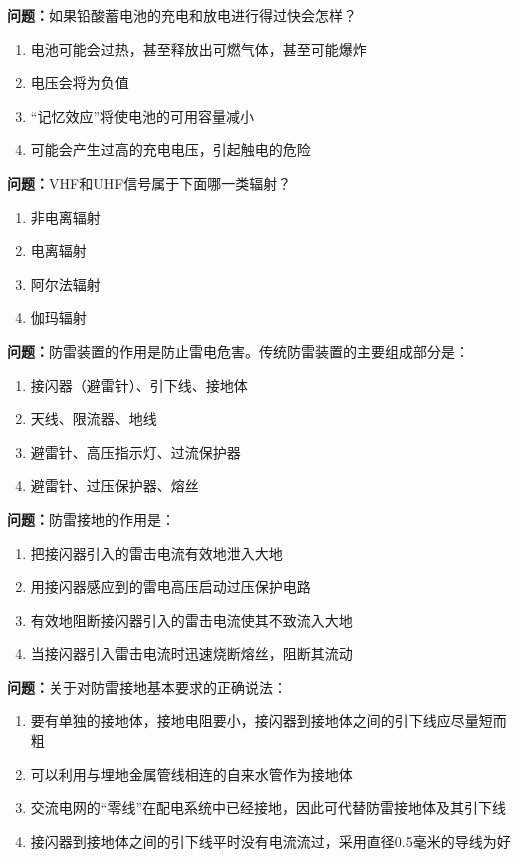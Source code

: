 \documentclass{ctexbook}
\begin{document}
\textbf{问题：}如果铅酸蓄电池的充电和放电进行得过快会怎样？
\begin{enumerate}[label=\Alph*), leftmargin=3em]
\item 电池可能会过热，甚至释放出可燃气体，甚至可能爆炸
\item 电压会将为负值
\item “记忆效应”将使电池的可用容量减小
\item 可能会产生过高的充电电压，引起触电的危险
\end{enumerate}

\textbf{问题：}VHF和UHF信号属于下面哪一类辐射？
\begin{enumerate}[label=\Alph*), leftmargin=3em]
\item 非电离辐射
\item 电离辐射
\item 阿尔法辐射
\item 伽玛辐射
\end{enumerate}

\textbf{问题：}防雷装置的作用是防止雷电危害。传统防雷装置的主要组成部分是：
\begin{enumerate}[label=\Alph*), leftmargin=3em]
\item 接闪器（避雷针）、引下线、接地体
\item 天线、限流器、地线
\item 避雷针、高压指示灯、过流保护器
\item 避雷针、过压保护器、熔丝
\end{enumerate}

\textbf{问题：}防雷接地的作用是：
\begin{enumerate}[label=\Alph*), leftmargin=3em]
\item 把接闪器引入的雷击电流有效地泄入大地
\item 用接闪器感应到的雷电高压启动过压保护电路
\item 有效地阻断接闪器引入的雷击电流使其不致流入大地
\item 当接闪器引入雷击电流时迅速烧断熔丝，阻断其流动
\end{enumerate}

\textbf{问题：}关于对防雷接地基本要求的正确说法：
\begin{enumerate}[label=\Alph*), leftmargin=3em]
\item 要有单独的接地体，接地电阻要小，接闪器到接地体之间的引下线应尽量短而粗
\item 可以利用与埋地金属管线相连的自来水管作为接地体
\item 交流电网的“零线”在配电系统中已经接地，因此可代替防雷接地体及其引下线
\item 接闪器到接地体之间的引下线平时没有电流流过，采用直径0.5毫米的导线为好
\end{enumerate}
\end{document}
